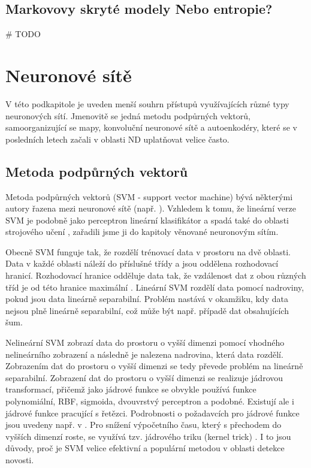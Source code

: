 \subsection{Markovovy skryté modely Nebo entropie?}
\# TODO

\section{Neuronové sítě}
V této podkapitole je uveden menší souhrn přístupů  využívajících různé typy neuronových sítí. Jmenovitě se jedná metodu podpůrných vektorů, samoorganizující se mapy, konvoluční neuronové sítě a autoenkodéry, které se v posledních letech začali v oblasti ND uplatňovat velice často.
\subsection{Metoda podpůrných vektorů}
Metoda podpůrných vektorů (SVM - support vector machine) bývá některými autory řazena mezi neuronové sítě (např. \cite{markou2}). Vzhledem k tomu, že lineární verze SVM \cite{svm1} je podobně jako perceptron \cite{perceptron} lineární klasifikátor a spadá také do oblasti strojového učení \cite{ml1,ml2}, zařadili jsme ji do kapitoly věnované neuronovým sítím.
\par 
Obecně SVM funguje tak, že rozdělí trénovací data v prostoru na dvě oblasti. Data v každé oblasti náleží do příslušné třídy a jsou oddělena rozhodovací hranicí. Rozhodovací hranice odděluje data tak, že vzdálenost dat z obou různých tříd je od této hranice maximální \cite{svm3}. Lineární SVM rozdělí data pomocí nadroviny, pokud jsou data lineárně separabilní. Problém nastává v okamžiku, kdy data nejsou plně lineárně separabilní, což může být např.  případě dat obsahujících šum.
\par 
Nelineární SVM \cite{svm1} zobrazí data do prostoru o vyšší dimenzi pomocí vhodného nelineárního zobrazení a následně je nalezena nadrovina, která data rozdělí. Zobrazením dat do prostoru o vyšší dimenzi se tedy převede problém na lineárně separabilní. Zobrazení dat do prostoru o vyšší dimenzi se realizuje jádrovou transformací, přičemž jako jádrové funkce se obvykle používá funkce polynomiální, RBF, sigmoida, dvouvrstvý perceptron a podobné. Existují ale i jádrové funkce pracující s řetězci. Podrobnosti o požadavcích pro jádrové funkce jsou uvedeny např. v \cite{svm4}. Pro snížení výpočetního času, který s přechodem do vyšších dimenzí roste, se využívá tzv. jádrového triku (kernel trick) \cite{kernel}. I to jsou důvody, proč je SVM velice efektivní a populární metodou v oblasti detekce novosti.
